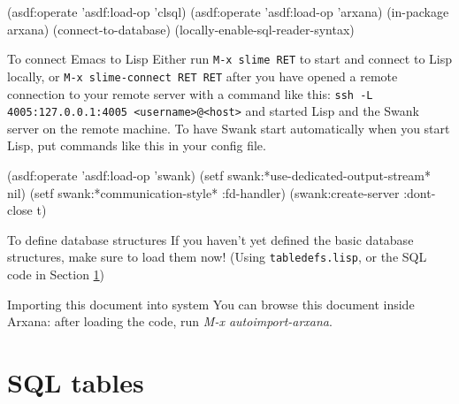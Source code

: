 \begin{idea}
(asdf:operate 'asdf:load-op 'clsql)
(asdf:operate 'asdf:load-op 'arxana)
(in-package arxana)
(connect-to-database)
(locally-enable-sql-reader-syntax)
\end{idea}

\begin{notate}{To connect Emacs to Lisp}
Either run {\tt M-x slime RET} to start and connect to
Lisp locally, or {\tt M-x slime-connect RET RET} after you
have opened a remote connection to your remote server with
a command like this: {\tt ssh -L 4005:127.0.0.1:4005
  <username>@<host>} and started Lisp and the Swank server
on the remote machine.  To have Swank start automatically
when you start Lisp, put commands like this in your config
file.
\end{notate}

\begin{idea}
(asdf:operate 'asdf:load-op 'swank)
(setf swank:*use-dedicated-output-stream* nil)
(setf swank:*communication-style* :fd-handler)
(swank:create-server :dont-close t)
\end{idea}

\begin{notate}{To define database structures}
If you haven't yet defined the basic database structures,
make sure to load them now!  (Using {\tt tabledefs.lisp},
or the SQL code in Section \ref{sql-code})
\end{notate}

\begin{notate}{Importing this document into system}
You can browse this document inside Arxana: after loading
the code, run \emph{M-x autoimport-arxana}.
\end{notate}

\section{SQL tables} \label{sql-code}

